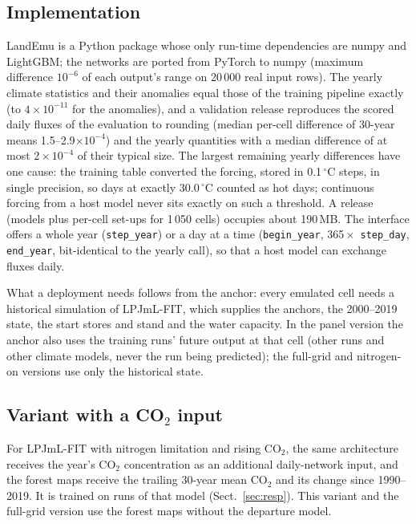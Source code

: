 \documentclass[11pt,a4paper]{article}
\newcommand{\x}{\ensuremath{\times}}
\begin{document}
\subsection{Implementation}\label{sec:impl}

LandEmu is a Python package whose only run-time dependencies are numpy and LightGBM; the networks are ported from
PyTorch to numpy (maximum difference $10^{-6}$ of each output's range on 20\,000 real input rows). The yearly climate
statistics and their anomalies equal those of the training pipeline exactly (to $4\times10^{-11}$ for the anomalies),
and a validation release reproduces the scored daily fluxes of the evaluation to rounding (median per-cell difference
of 30-year means 1.5--2.9$\times10^{-4}$) and the yearly quantities with a median difference of at most
$2\times10^{-4}$ of their typical size. The largest remaining yearly differences have one cause: the training table converted the forcing, stored in 0.1\,$^\circ$C steps, in single
precision, so days at exactly 30.0\,$^\circ$C counted as hot days; continuous forcing from a host model never sits
exactly on such a threshold. A release (models plus per-cell set-ups for 1\,050 cells) occupies about 190\,MB. The
interface offers a whole year (\texttt{step\_year}) or a day at a time (\texttt{begin\_year}, 365\,\x\,
\texttt{step\_day}, \texttt{end\_year}, bit-identical to the yearly call), so that a host model can exchange fluxes
daily.

What a deployment needs follows from the anchor: every emulated cell needs a historical simulation of LPJmL-FIT, which
supplies the anchors, the 2000--2019 state, the start stores and stand and the water capacity. In the panel version the
anchor also uses the training runs' future output at that cell (other runs and other climate models, never the run
being predicted); the full-grid and nitrogen-on versions use only the historical state.

\subsection{Variant with a \texorpdfstring{CO$_2$}{CO2} input}\label{sec:co2var}

For LPJmL-FIT with nitrogen limitation and rising CO$_2$, the same architecture receives the year's CO$_2$
concentration as an additional daily-network input, and the forest maps receive the trailing 30-year mean CO$_2$ and its
change since 1990--2019. It is trained on runs of that model (Sect.~\ref{sec:resp}). This variant and the full-grid
version use the forest maps without the departure model.
\end{document}
